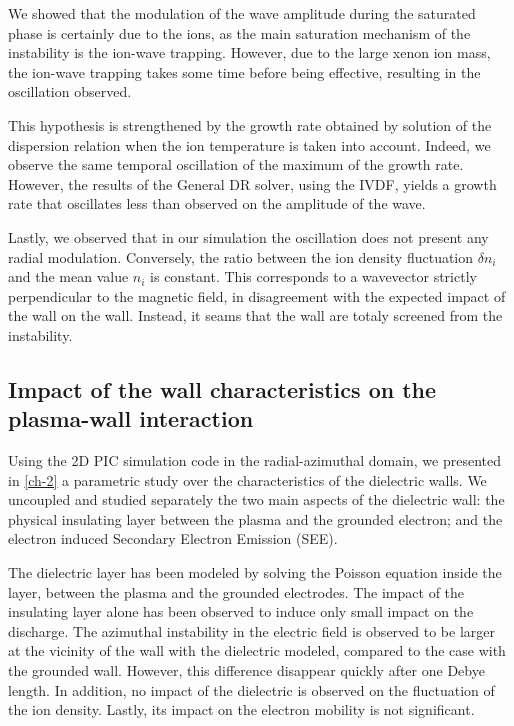 We showed that the modulation of the wave amplitude during the saturated phase is certainly due to the ions, as the main saturation mechanism of the instability is the ion-wave trapping.
However, due to the large xenon ion mass, the ion-wave trapping takes some time before being effective, resulting in the oscillation observed.

This hypothesis is strengthened by the growth rate obtained by solution of the dispersion relation when the ion temperature is taken into account.
Indeed, we observe the same temporal oscillation of the maximum of the  growth rate.
However, the results of the General DR solver, using the IVDF, yields a growth rate that oscillates less than observed on the amplitude of the wave.

Lastly, we observed that in our simulation the oscillation does not present any radial modulation.
Conversely, the ratio between the ion density fluctuation $\delta n_i$ and the mean value $n_i$ is constant. 
This corresponds to a wavevector strictly perpendicular to the magnetic field, in disagreement with the expected impact of the wall on the wall.
Instead, it seams that the wall are totaly screened from the instability.


\subsection{Impact of the wall characteristics on the plasma-wall interaction }
Using the 2D PIC simulation code in the radial-azimuthal domain, we presented in \cref{ch-2} a parametric study over the characteristics of the dielectric walls.
We uncoupled and studied separately the two main aspects of the dielectric wall\string: the physical insulating layer between the plasma and the grounded electron; and the electron induced Secondary Electron Emission (SEE).

The dielectric layer has been modeled by solving the Poisson equation inside the layer, between the plasma and the grounded electrodes.
The impact of the insulating layer alone has been observed to induce only small impact on the discharge.
The azimuthal instability in the electric field is observed to be larger at the vicinity of the wall with the dielectric modeled, compared to the case with the grounded wall.
However, this difference disappear quickly after one Debye length.
In addition, no impact of the dielectric is observed on the fluctuation of the ion density.
Lastly, its impact on the electron mobility is not significant.

